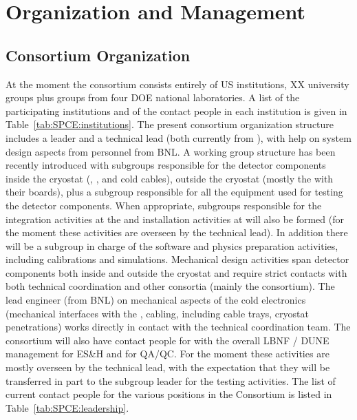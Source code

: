 \section{Organization and Management}
\label{sec:fdsp-tpcelec-management}

\subsection{Consortium Organization}
\label{sec:fdsp-tpcelec-management-consort}

At the moment the  consortium consists entirely of
US institutions, XX university groups plus groups from four
DOE national laboratories. A list of the participating institutions
and of the contact people in each institution is given in
Table~\ref{tab:SPCE:institutions}. The present consortium organization
structure includes a leader and a technical lead (both currently
from \fnal), with help on system design aspects from personnel
from BNL. A working group structure has been recently 
introduced with subgroups responsible for the detector 
components inside the cryostat (, , and
cold cables), outside the cryostat (mostly the  with 
their boards), plus a subgroup responsible for all the equipment
used for testing the detector components. When appropriate, subgroups
responsible for the integration activities at the  and
installation activities at \surf will also be formed (for the moment 
these activities are overseen by the technical lead). In addition
there will be a subgroup in charge of the software and physics
preparation activities, including calibrations and simulations.
Mechanical design activities span detector components both inside
and outside the cryostat and require strict contacts with both
technical coordination and other consortia (mainly the 
consortium). The lead engineer (from BNL) on mechanical aspects of the cold
electronics (mechanical interfaces with the , cabling, including 
cable trays, cryostat penetrations) works directly in contact with
the technical coordination team. The consortium will also have 
contact people for with the overall LBNF / DUNE management for
ES\&H and for QA/QC. For the moment these activities are mostly
overseen by the technical lead, with the expectation that they
will be transferred in part to the subgroup leader for the testing
activities. The list of current contact people for the various 
positions in the Consortium is listed in Table~\ref{tab:SPCE:leadership}.

